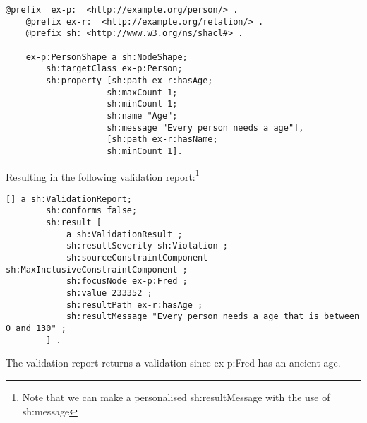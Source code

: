 \begin{lstlisting}[frame=single, language=turtle, frame=none]
    @prefix  ex-p:  <http://example.org/person/> . 
    @prefix ex-r:  <http://example.org/relation/> . 
    @prefix sh:	<http://www.w3.org/ns/shacl#> .

    ex-p:PersonShape a sh:NodeShape;
        sh:targetClass ex-p:Person;
        sh:property [sh:path ex-r:hasAge; 
                    sh:maxCount 1;
                    sh:minCount 1;
                    sh:name "Age";
                    sh:message "Every person needs a age"],
                    [sh:path ex-r:hasName;
                    sh:minCount 1].
\end{lstlisting}
Resulting in the following validation report:\footnote{Note that we can make a personalised sh:resultMessage with the use of sh:message}
\begin{lstlisting}[frame=single, language=turtle, frame=none]
    [] a sh:ValidationReport;
        sh:conforms false;
        sh:result [
            a sh:ValidationResult ;
            sh:resultSeverity sh:Violation ;
            sh:sourceConstraintComponent sh:MaxInclusiveConstraintComponent ;
            sh:focusNode ex-p:Fred ;
            sh:value 233352 ;
            sh:resultPath ex-r:hasAge ;
            sh:resultMessage "Every person needs a age that is between 0 and 130" ;
        ] .        
\end{lstlisting}
The validation report returns a validation since ex-p:Fred has an ancient age.

